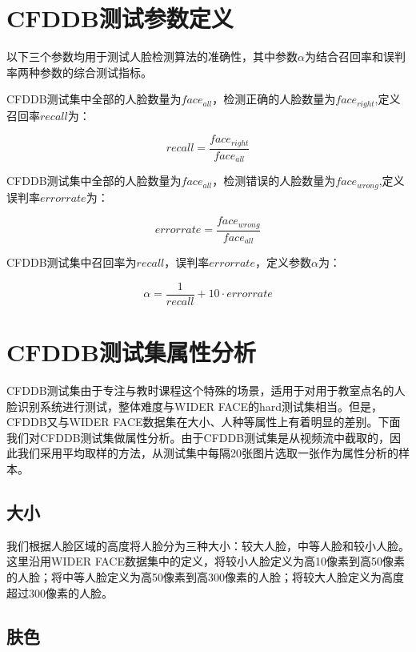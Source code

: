 \section{CFDDB测试参数定义}

以下三个参数均用于测试人脸检测算法的准确性，其中参数$\alpha$为结合召回率和误判率两种参数的综合测试指标。

CFDDB测试集中全部的人脸数量为$face_{all}$，检测正确的人脸数量为$face_{right}$,定义召回率$recall$为：

\begin{displaymath}
\label{eq:rdef}
recall = \frac{face_{right}}{face_{all}} 
\end{displaymath}

CFDDB测试集中全部的人脸数量为$face_{all}$，检测错误的人脸数量为$face_{wrong}$,定义误判率$errorrate$为：

\begin{displaymath}
\label{eq:edef}
errorrate = \frac{face_{wrong}}{face_{all}} 
\end{displaymath}

CFDDB测试集中召回率为$recall$，误判率$errorrate$，定义参数$\alpha$为：

\begin{displaymath}
\label{eq:alphadef}
\alpha = \frac{1}{recall} + 10\cdot errorrate
\end{displaymath}

\section{CFDDB测试集属性分析}

CFDDB测试集由于专注与教时课程这个特殊的场景，适用于对用于教室点名的人脸识别系统进行测试，整体难度与WIDER FACE的hard测试集相当。但是，CFDDB又与WIDER FACE数据集在大小、人种等属性上有着明显的差别。下面我们对CFDDB测试集做属性分析。由于CFDDB测试集是从视频流中截取的，因此我们采用平均取样的方法，从测试集中每隔20张图片选取一张作为属性分析的样本。

\subsection{大小}

我们根据人脸区域的高度将人脸分为三种大小：较大人脸，中等人脸和较小人脸。这里沿用WIDER FACE数据集中的定义，将较小人脸定义为高10像素到高50像素的人脸；将中等人脸定义为高50像素到高300像素的人脸；将较大人脸定义为高度超过300像素的人脸。

\subsection{肤色}

